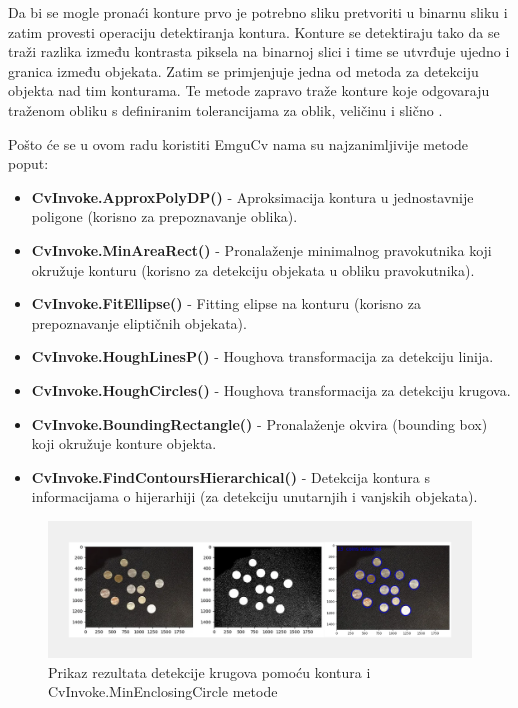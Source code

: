 \documentclass{foi}
\begin{document}
Da bi se mogle pronaći konture prvo je potrebno sliku pretvoriti u binarnu sliku i zatim provesti operaciju detektiranja kontura. Konture se detektiraju tako da se traži razlika između kontrasta piksela na binarnoj slici i time se utvrđuje ujedno i granica između objekata. Zatim se primjenjuje jedna od metoda za detekciju objekta nad tim konturama. Te metode zapravo traže konture koje odgovaraju traženom obliku s definiranim tolerancijama za oblik, veličinu i slično \cite{konturesShapes}.

\begin{flushleft}
    Pošto će se u ovom radu koristiti EmguCv nama su najzanimljivije metode poput:
    \begin{itemize}
        \item \textbf{CvInvoke.ApproxPolyDP()} - Aproksimacija kontura u jednostavnije poligone (korisno za prepoznavanje oblika).
        \item \textbf{CvInvoke.MinAreaRect()} - Pronalaženje minimalnog pravokutnika koji okružuje konturu (korisno za detekciju objekata u obliku pravokutnika).
        \item \textbf{CvInvoke.FitEllipse()} - Fitting elipse na konturu (korisno za prepoznavanje eliptičnih objekata).
        \item \textbf{CvInvoke.HoughLinesP()} - Houghova transformacija za detekciju linija.
        \item \textbf{CvInvoke.HoughCircles()} - Houghova transformacija za detekciju krugova.
        \item \textbf{CvInvoke.BoundingRectangle()} - Pronalaženje okvira (bounding box) koji okružuje konture objekta.
        \item \textbf{CvInvoke.FindContoursHierarchical()} - Detekcija kontura s informacijama o hijerarhiji (za detekciju unutarnjih i vanjskih objekata).
    \end{itemize}
\end{flushleft}

\begin{figure}[H]
    \centering
    \includegraphics[width=1.0\linewidth]{slike/shapeDetection.png}
    \caption{\centering Prikaz rezultata detekcije krugova pomoću kontura i CvInvoke.MinEnclosingCircle metode \cite{segvsdetection_2}}
\end{figure}
\end{document}
